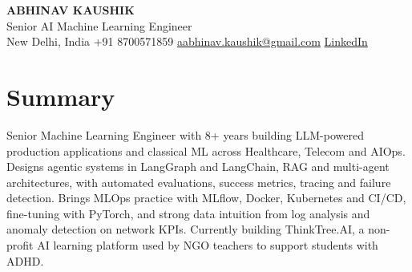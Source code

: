 \documentclass[10pt,a4paper]{article}
\begin{document}
\begin{center}
  {\LARGE\bfseries ABHINAV KAUSHIK}\\[2pt]
  {\large Senior AI Machine Learning Engineer}\\[2pt]
  New Delhi, India \textbar{} +91 8700571859 \textbar{} \href{mailto:aabhinav.kaushik@gmail.com}{aabhinav.kaushik@gmail.com} \textbar{} \href{https://www.linkedin.com/in/abhinav-kaushik10/}{LinkedIn}  
\end{center}

\section{Summary}
Senior Machine Learning Engineer with 8+ years building LLM-powered production applications and classical ML across Healthcare, Telecom and AIOps. Designs agentic systems in LangGraph and LangChain, RAG and multi-agent architectures, with automated evaluations, success metrics, tracing and failure detection. Brings MLOps practice with MLflow, Docker, Kubernetes and CI/CD, fine-tuning with PyTorch, and strong data intuition from log analysis and anomaly detection on network KPIs. Currently building ThinkTree.AI, a non-profit AI learning platform used by NGO teachers to support students with ADHD.
\end{document}
